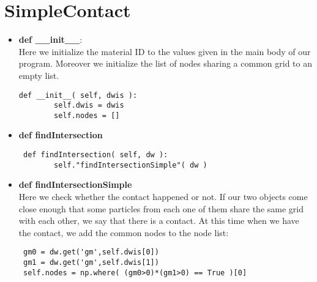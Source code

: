 \documentclass[11pt,fleqn]{book} %
\begin{document}
\section{SimpleContact}
\begin{itemize}
\item \textbf{def \_\_init\_\_}:\\
Here we initialize the material ID to the values given in the main body of our program. Moreover we initialize the list of nodes sharing a common grid to an empty list. 
\begin{lstlisting}
def __init__( self, dwis ):
        self.dwis = dwis
        self.nodes = []
\end{lstlisting}
\item \textbf{def findIntersection}\\
\begin{lstlisting}
 def findIntersection( self, dw ):
        self."findIntersectionSimple"( dw )
\end{lstlisting}
\item \textbf{def findIntersectionSimple}\\
Here we check whether the contact happened or not. If our two objects come close enough that some particles from each one of them share the same grid with each other, we say that there is a contact. At this time when we have the contact, we add the common nodes to the node list:
\begin{lstlisting}
 gm0 = dw.get('gm',self.dwis[0])
 gm1 = dw.get('gm',self.dwis[1])
 self.nodes = np.where( (gm0>0)*(gm1>0) == True )[0]
\end{lstlisting}
\end{itemize}
\end{document}
